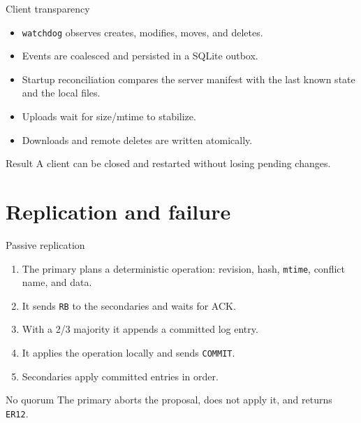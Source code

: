 \documentclass[aspectratio=169]{beamer}
\begin{document}
\begin{frame}{Client transparency}
  \begin{itemize}
    \item \texttt{watchdog} observes creates, modifies, moves, and deletes.
    \item Events are coalesced and persisted in a SQLite outbox.
    \item Startup reconciliation compares the server manifest with the last
      known state and the local files.
    \item Uploads wait for size/mtime to stabilize.
    \item Downloads and remote deletes are written atomically.
  \end{itemize}
  \vspace{0.3cm}
  \begin{block}{Result}
    A client can be closed and restarted without losing pending changes.
  \end{block}
\end{frame}

\section{Replication and failure}

\begin{frame}{Passive replication}
  \begin{enumerate}
    \item The primary plans a deterministic operation: revision, hash,
      \texttt{mtime}, conflict name, and data.
    \item It sends \texttt{RB} to the secondaries and waits for ACK.
    \item With a 2/3 majority it appends a committed log entry.
    \item It applies the operation locally and sends \texttt{COMMIT}.
    \item Secondaries apply committed entries in order.
  \end{enumerate}
  \vspace{0.3cm}
  \begin{alertblock}{No quorum}
    The primary aborts the proposal, does not apply it, and returns \texttt{ER12}.
  \end{alertblock}
\end{frame}
\end{document}
